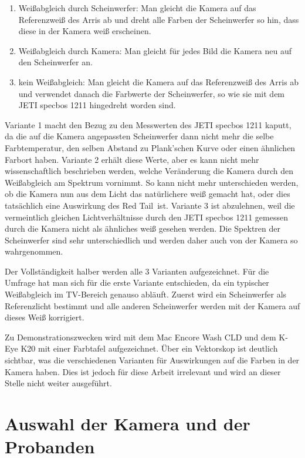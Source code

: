 \begin{enumerate}\setlength{\itemsep}{0ex}
\item Weißabgleich durch Scheinwerfer: Man gleicht die Kamera auf das Referenzweiß des Arris ab und dreht alle Farben der Scheinwerfer so hin, dass diese in der Kamera weiß erscheinen.
\item Weißabgleich durch Kamera: Man gleicht für jedes Bild die Kamera neu auf den Scheinwerfer an.
\item kein Weißabgleich: Man gleicht die Kamera auf das Referenzweiß des Arris ab und verwendet danach die Farbwerte der Scheinwerfer, so wie sie mit dem JETI specbos 1211 hingedreht worden sind.
\end{enumerate}

Variante 1 macht den Bezug zu den Messwerten des JETI specbos 1211 kaputt, da die auf die Kamera angepassten Scheinwerfer dann nicht mehr die selbe Farbtemperatur, den selben Abstand zu Plank'schen Kurve oder einen ähnlichen Farbort haben. Variante 2 erhält diese Werte, aber es kann nicht mehr wissenschaftlich beschrieben werden, welche Veränderung die Kamera durch den Weißabgleich am Spektrum vornimmt. So kann nicht mehr unterschieden werden, ob die Kamera nun aus dem Licht das natürlichere weiß gemacht hat, oder dies tatsächlich eine Auswirkung des \glqq Red Tail\grqq\ ist.
Variante 3 ist abzulehnen, weil die vermeintlich gleichen Lichtverhältnisse durch den JETI specbos 1211 gemessen durch die Kamera nicht als ähnliches weiß gesehen werden. Die Spektren der Scheinwerfer sind sehr unterschiedlich und werden daher auch von der Kamera so wahrgenommen.

Der Vollständigkeit halber werden alle 3 Varianten aufgezeichnet. Für die Umfrage hat man sich für die erste Variante entschieden, da ein typischer Weißabgleich im TV-Bereich genauso abläuft. Zuerst wird ein Scheinwerfer als Referenzlicht bestimmt und alle anderen Scheinwerfer werden mit der Kamera auf dieses Weiß korrigiert. 

Zu Demonstrationszwecken wird mit dem Mac Encore Wash CLD und dem K-Eye K20 mit einer Farbtafel aufgezeichnet. Über ein Vektorskop ist deutlich sichtbar, was die verschiedenen Varianten für Auswirkungen auf die Farben in der Kamera haben. Dies ist jedoch für diese Arbeit irrelevant und wird an dieser Stelle nicht weiter ausgeführt. %

\section{Auswahl der Kamera und der Probanden}
\label{sec_wahlderKamera}

